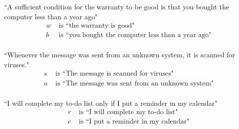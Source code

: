 \documentclass[12pt, oneside]{article}
\begin{document}
\begin{multicols}{2}
``A sufficient condition for the warranty to be good is that you bought the computer less than a year ago"
\columnbreak
\begin{align*}
w &\text{ is  ``the warranty is good"} \\
b &\text{ is  ``you bought the computer less than a year ago"} \\
\end{align*}
\end{multicols}
\vfill

\begin{multicols}{2}
``Whenever the message was sent from an unknown system, it is scanned for viruses."
\columnbreak
\begin{align*}
s &\text{ is  ``The message is scanned for viruses"} \\
u &\text{ is  ``The message was sent from an unknown system"} \\
\end{align*}
\end{multicols}
\vfill

\begin{multicols}{2}
``I will complete my to-do list only if I put a reminder in my calendar"
\columnbreak
\begin{align*}
r &\text{ is  ``I will complete my to-do list"} \\
c &\text{ is  ``I put a reminder in my calendar"} \\
\end{align*}
\end{multicols}
\vfill \vfill
\end{document}
